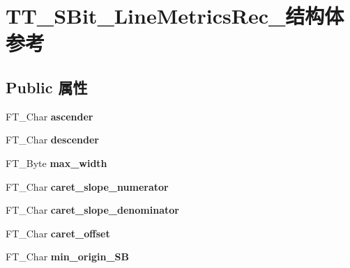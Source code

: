 \hypertarget{struct_t_t___s_bit___line_metrics_rec__}{}\section{T\+T\+\_\+\+S\+Bit\+\_\+\+Line\+Metrics\+Rec\+\_\+结构体 参考}
\label{struct_t_t___s_bit___line_metrics_rec__}
\subsection*{Public 属性}
\begin{DoxyCompactItemize}
\item 
\mbox{\label{struct_t_t___s_bit___line_metrics_rec___a4114f4a3c2955d708af80a4fedac026c}} 
F\+T\+\_\+\+Char {\bfseries ascender}
\item 
\mbox{\label{struct_t_t___s_bit___line_metrics_rec___a3c387250cdf45758febc01ed1b4ef00b}} 
F\+T\+\_\+\+Char {\bfseries descender}
\item 
\mbox{\label{struct_t_t___s_bit___line_metrics_rec___aebad76a445c06ac0634a60a015b0f626}} 
F\+T\+\_\+\+Byte {\bfseries max\+\_\+width}
\item 
\mbox{\label{struct_t_t___s_bit___line_metrics_rec___a881a12022b8d2c6524caaf17a1533371}} 
F\+T\+\_\+\+Char {\bfseries caret\+\_\+slope\+\_\+numerator}
\item 
\mbox{\label{struct_t_t___s_bit___line_metrics_rec___a07a53a9cc279b5d98e54d1fc6fe6e480}} 
F\+T\+\_\+\+Char {\bfseries caret\+\_\+slope\+\_\+denominator}
\item 
\mbox{\label{struct_t_t___s_bit___line_metrics_rec___a313481bae7dbe952123b0e41d1d0bd10}} 
F\+T\+\_\+\+Char {\bfseries caret\+\_\+offset}
\item 
\mbox{\label{struct_t_t___s_bit___line_metrics_rec___a9e87d66e6546346385864d416dfbb9a9}} 
F\+T\+\_\+\+Char {\bfseries min\+\_\+origin\+\_\+\+SB}

\end{DoxyCompactItemize}
